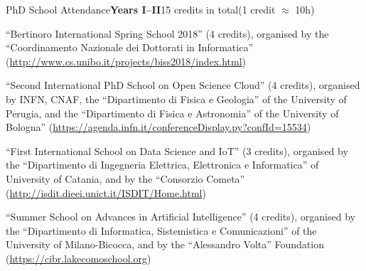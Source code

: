 \begin{activity}{PhD School Attendance}{\textbf{Years I--II}}{15 credits in total}{(1 credit $\approx$ 10h)}
    \item ``Bertinoro International Spring School 2018'' (4 credits), organised by the ``Coordinamento Nazionale dei Dottorati in Informatica'' (\url{http://www.cs.unibo.it/projects/biss2018/index.html})

    \item ``Second International PhD School on Open Science Cloud'' (4 credits), organised by INFN, CNAF, the ``Dipartimento di Fisica e Geologia'' of the University of Perugia, and the ``Dipartimento di Fisica e Astronomia'' of the University of Bologna'' (\url{https://agenda.infn.it/conferenceDisplay.py?confId=15534})

    \item ``First International School on Data Science and IoT'' (3 credits), organised by the ``Dipartimento di Ingegneria Elettrica, Elettronica e Informatica'' of University of Catania, and by the ``Consorzio Cometa'' (\url{http://isdit.dieei.unict.it/ISDIT/Home.html})

    \item ``Summer School on Advances in Artificial Intelligence'' (4 credits), organised by the ``Dipartimento di Informatica, Sistemistica e Comunicazioni'' of the University of Milano-Bicocca, and by the ``Alessandro Volta'' Foundation
     (\url{https://cibr.lakecomoschool.org})
\end{activity}

